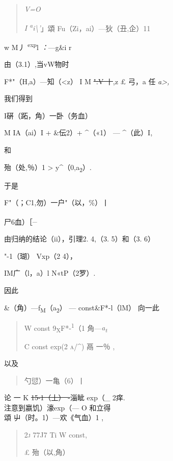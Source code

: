 \documentclass{article}
\begin{document}
\begin{quote}
\emph{V=O}

\emph{I \textsuperscript{a}i\textbackslash{}'}」頌
{\textbar{}Fu（Zi，ai）---狄（丑,企）1}1
\end{quote}

w M丿 \textsuperscript{exp}l \emph{：}---g\&i r

由（3.1）,当vW物时

\textbar{}F*"（H,a）---知（\textless{}z） I M \sout{":V 丨},z £ 弓，a 任
\emph{a\textgreater{},}

我们得到

I硏（跖，角）一卧（务血）\textbar{}

M IA（ai）I + \textbar{}\&伝2）+ \textbar{}\^{}（«1） --- \^{}（此）I,

和

\textbar{}殆（处,％）1 \textgreater{}
y\textbar{}\^{}（0,a\textsubscript{2}）\textbar{}.

于是

{\textbar{}F"（；C1,勿）一户"（以，\%）丨}

\textbar{}尸6血）［\textsuperscript{\_}

由归纳的结论（ii），引理2. 4,（3. 5）和（3. 6）

\textbar{}"-1（瑚）\textbar{} Vxp（2 4），

IM广（l，a）l N«tP（2罗）.

因此

\textbar{}\&（角）---f\textsubscript{M}（a\textsubscript{2}） \textbar{}
--- const\textbar{}\&F*-l（lM） \textbar{} \textbar{}向一此\textbar{}

\begin{quote}
W const \textbar{}9\textsubscript{X}F*-\textsuperscript{1}（1 \textbar{}
\textbar{}角---\emph{a\textsubscript{t} \textbar{}}

C const exp(2 \textsc{a/\^{})} \textbar{}鬲 一％ \textbar{},
\end{quote}

以及

\begin{quote}
\textbar{}勺愆）一亀（6）丨
\end{quote}

论 一 K \sout{15-1（丄）\textbar{} -}淄眦 exp（\_ 2痒.\\
注意到\textbar{}嬴饥）\textbar{}濠exp（--- O 和立得\\
頌 屮（时。1）---欢《气血）1 ,

\begin{quote}
\textsc{2j} 77J7 Ti W const,

£ \textbar{}殆（以,角）\textbar{}
\end{quote}
\end{document}
